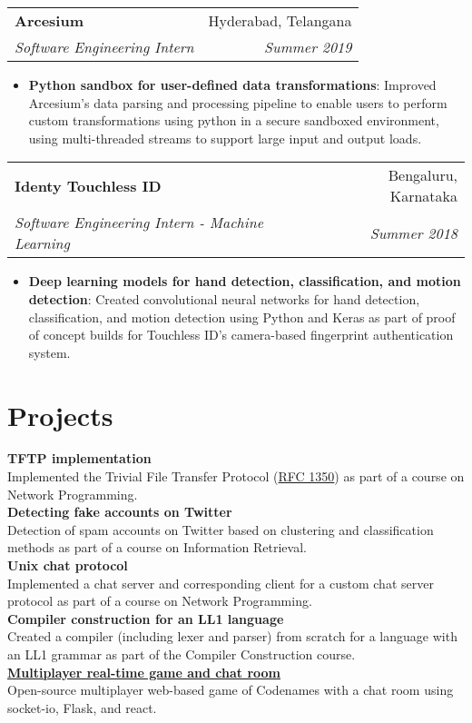 \documentclass[letterpaper,11pt]{article}
\makeatletter
\newcommand{\resumeItem}[2]{
  \item\small{
    \textbf{#1}{: #2 \vspace{-1pt}}
  }
}
\newcommand{\resumeSubheading}[4]{
  \vspace{10pt}
    \begin{tabular*}{0.97\textwidth}{l@{\extracolsep{\fill}}r}
      \textbf{#1} & #2 \\
      \textit{\small#3} & \textit{\small #4} \\
    \end{tabular*}\vspace{-1pt}
}
\newcommand{\resumeItemListStart}{\begin{itemize}}
\newcommand{\resumeItemListEnd}{\end{itemize}\vspace{-2pt}}
\makeatother
\begin{document}
\resumeSubheading
{Arcesium}{Hyderabad, Telangana}
{Software Engineering Intern}{Summer 2019}
\resumeItemListStart
\resumeItem{Python sandbox for user-defined data transformations}
{Improved Arcesium's data parsing and processing pipeline to enable users to perform custom transformations using python in a secure sandboxed environment, using multi-threaded streams to support large input and output loads.}
\resumeItemListEnd

\resumeSubheading
{Identy Touchless ID}{Bengaluru, Karnataka}
{Software Engineering Intern - Machine Learning}{Summer 2018}
\resumeItemListStart
\resumeItem{Deep learning models for hand detection, classification, and motion detection}
{Created convolutional neural networks for hand detection, classification, and motion detection using Python and Keras as part of proof of concept builds for Touchless ID's camera-based fingerprint authentication system.}
\resumeItemListEnd


\section{Projects}
\textbf{TFTP implementation} \\
Implemented the Trivial File Transfer Protocol (\href{https://datatracker.ietf.org/doc/html/rfc1350}{RFC 1350}) as part of a course on Network Programming.
\vspace{3mm} \\
\textbf{Detecting fake accounts on Twitter} \\
Detection of spam accounts on Twitter based on clustering and classification methods as part of a course on Information Retrieval.
\vspace{3mm} \\
\pagebreak
\textbf{Unix chat protocol} \\
Implemented a chat server and corresponding client for a custom chat server protocol as part of a course on Network Programming.
\vspace{3mm} \\
\textbf{Compiler construction for an LL1 language} \\
Created a compiler (including lexer and parser) from scratch for a language with an LL1 grammar as part of the Compiler Construction course.
\vspace{3mm} \\
\textbf{\href{https://github.com/naveen-u/lets-play}{Multiplayer real-time game and chat room}} \\
Open-source multiplayer web-based game of Codenames with a chat room using socket-io, Flask, and react.
\end{document}
